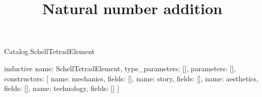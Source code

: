 \begin{lexlean}{Catalog.SchellTetradElement}
\title{Natural number addition}
\begin{semanticmodule}
inductive{
  name: SchellTetradElement,
  type_parameters: [],
  parameters: [],
  constructors: [
    {name: mechanics, fields: []},
    {name: story, fields: []},
    {name: aesthetics, fields: []},
    {name: technology, fields: []}
  ]
}
\end{semanticmodule}
\end{lexlean}
